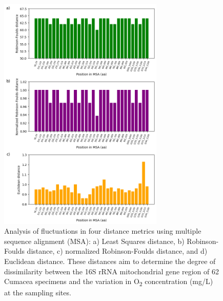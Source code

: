 {\begin{figure}[]
    \centering
    \includegraphics[width=0.7\textwidth]{figure6.png}
    \caption{Analysis of fluctuations in four distance metrics using multiple sequence alignment (MSA): a) Least Squares distance, b) Robinson-Foulds distance, c) normalized Robinson-Foulds distance, and d) Euclidean distance. These distances aim to determine the degree of dissimilarity between the 16S rRNA mitochondrial gene region of 62 Cumacea specimens and the variation in O\textsubscript{2} concentration (mg/L) at the sampling sites. \label{fig:fig7}}
\end{figure}

}
